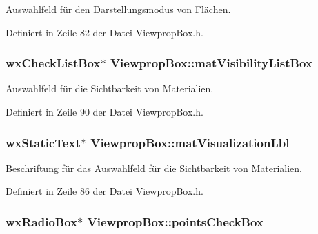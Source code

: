 Auswahlfeld für den Darstellungsmodus von Flächen. 



Definiert in Zeile 82 der Datei Viewprop\-Box.\-h.

\hypertarget{classViewpropBox_a8e6d0646ebdd844f96acde46e63fb74d}{
\subsubsection[{mat\-Visibility\-List\-Box}]{\setlength{\rightskip}{0pt plus 5cm}wx\-Check\-List\-Box$\ast$ Viewprop\-Box\-::mat\-Visibility\-List\-Box\hspace{0.3cm}{\ttfamily [private]}}}\label{classViewpropBox_a8e6d0646ebdd844f96acde46e63fb74d}


Auswahlfeld für die Sichtbarkeit von Materialien. 



Definiert in Zeile 90 der Datei Viewprop\-Box.\-h.

\hypertarget{classViewpropBox_a6352cdc6579ed2b9a7cfdd28a847bfec}{
\subsubsection[{mat\-Visualization\-Lbl}]{\setlength{\rightskip}{0pt plus 5cm}wx\-Static\-Text$\ast$ Viewprop\-Box\-::mat\-Visualization\-Lbl\hspace{0.3cm}{\ttfamily [private]}}}\label{classViewpropBox_a6352cdc6579ed2b9a7cfdd28a847bfec}


Beschriftung für das Auswahlfeld für die Sichtbarkeit von Materialien. 



Definiert in Zeile 86 der Datei Viewprop\-Box.\-h.

\hypertarget{classViewpropBox_a706dfcdceaa1afff899f51eb2ebded81}{
\subsubsection[{points\-Check\-Box}]{\setlength{\rightskip}{0pt plus 5cm}wx\-Radio\-Box$\ast$ Viewprop\-Box\-::points\-Check\-Box\hspace{0.3cm}{\ttfamily [private]}}}\label{classViewpropBox_a706dfcdceaa1afff899f51eb2ebded81}


